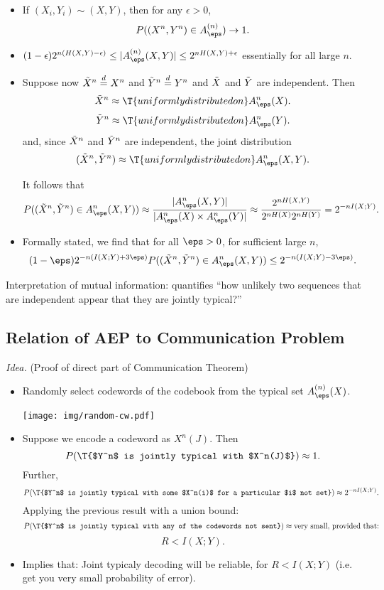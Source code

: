 \begin{itemize}
  \item If $(X_i, Y_i) \sim (X, Y)$, then for any $\epsilon > 0$,
\[
  P((X^n, Y^n)  \in A_{\eps}^{(n)} ) \to 1.
\]

\item $ (1- \epsilon) 2^{n (H(X, Y) - \epsilon)} \leq |A_{\eps}^{(n)} (X, Y)| \leq 2^{nH(X, Y) + \epsilon}$ essentially for all large $n$.

\def\eqd{\stackrel{d}{=}}

\item Suppose now $\tilde{X}^n \stackrel{d}{=} X^n$ and $\Yt^n \eqd Y^n$ and $\tilde{X}$ and $\tilde{Y}$ are independent.  Then
  \[
    \Xt^n \approx \T{uniformly distributed on } A_{\eps}^{n}(X).
  \]
  \[
      \Yt^n \approx \T{uniformly distributed on } A_{\eps}^{n} (Y).
    \]
    and, since $\tilde{X}^n$ and $\tilde{Y}^n$ are independent, the joint distribution
    \[
      (\Xt^n, \Yt^n) \approx \T{uniformly distributed on } A_{\eps}^{n} (X, Y).
    \]

    It follows that
    \[
      P( (\Xt^n, \Yt^n) \in A_{\eps}^{n} (X, Y)) \approx \frac{|A_{\eps}^{n} (X, Y)|}{|A_{\eps}^{n}(X) \times A_{\eps}^{n} (Y)|} \approx \frac{2^{n H(X, Y)}}{2^{n H(X)} 2^{n H(Y)}} = 2^{-n I(X; Y)}.
    \]

  \item Formally stated, we find that for all $\eps > 0$, for sufficient large $n$,
    \[
      (1 - \eps) 2^{-n (I (X; Y) + 3 \eps)}P( (\Xt^n, \Yt^n) \in A_{\eps}^{n} (X, Y)) \leq 2^{-n (I(X; Y) - 3 \eps)}.
    \]
\end{itemize}

Interpretation of mutual information: quantifies ``how unlikely two sequences that are independent appear that they are jointly typical?''

\subsection{Relation of AEP to Communication Problem}

{\it Idea.} (Proof of direct part of Communication Theorem)

\begin{itemize}
  \item Randomly select codewords of the codebook from the typical set $A_{\eps}^{(n)}(X)$.


    \texttt{[image: img/random-cw.pdf]}

  \item Suppose we encode a codeword as $X^n(J)$.  Then
    \[
      P(\T{$Y^n$ is jointly typical with $X^n(J)$} ) \approx 1.
    \]
    Further,
    \[
      P(\T{$Y^n$ is jointly typical with some $X^n(i)$ for a particular $i$ not set}) \approx 2^{-n I(X; Y)}.
    \]
    Applying the previous result with a union bound:
    \[
      P(\T{$Y^n$ is jointly typical with any of the codewords not sent}) \approx \text{very small, provided that:}
    \]
    \[
      R < I(X; Y).
    \]
  \item Implies that: Joint typicaly decoding will be reliable, for $R < I(X; Y)$ (i.e. get you very small probability of error).
\end{itemize}

